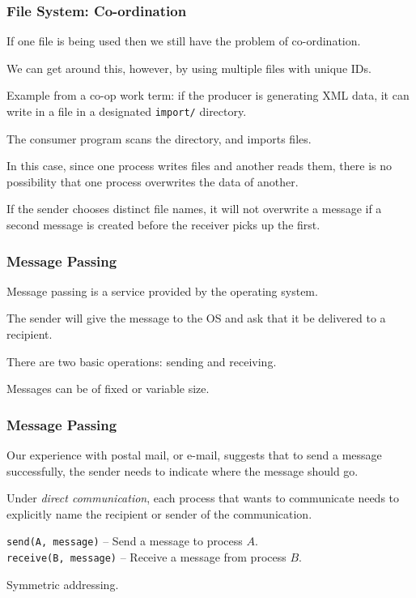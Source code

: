 \begin{frame}
\frametitle{File System: Co-ordination}

If one file is being used then we still have the problem of co-ordination.

We can get around this, however, by using multiple files with unique IDs. 

Example from a co-op work term: if the producer is generating XML data, it can write in a file in a designated \texttt{import/} directory. 

The consumer program scans the directory, and imports files.

In this case, since one process writes files and another reads them, there is no possibility that one process overwrites the data of another. 

If the sender chooses distinct file names, it will not overwrite a message if a second message is created before the receiver picks up the first.

\end{frame}

\begin{frame}
\frametitle{Message Passing}

Message passing is a service provided by the operating system.

The sender will give the message to the OS and ask that it be delivered to a recipient.

  There are two basic operations: sending and receiving. 
  
  Messages can be of fixed or variable size.


\end{frame}

\begin{frame}
\frametitle{Message Passing}

Our experience with postal mail, or e-mail, suggests that to send a message successfully, the sender needs to indicate where the message should go. 

Under \textit{direct communication}, each process that wants to communicate needs to explicitly name the recipient or sender of the communication.


\texttt{send(A, message)} -- Send a message to process $A$.\\
\texttt{receive(B, message)} -- Receive a message from process $B$.

Symmetric addressing.

\end{frame}

